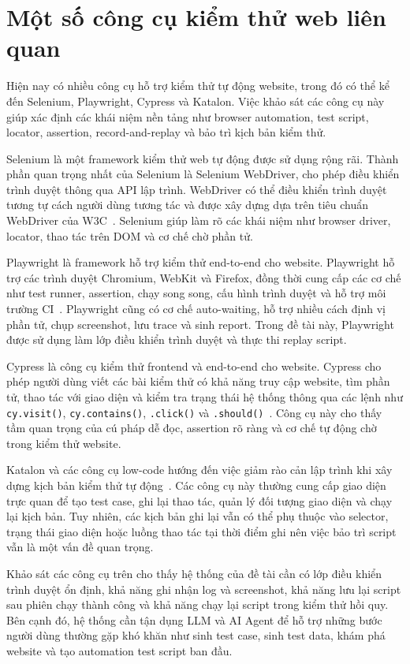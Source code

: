\section{Một số công cụ kiểm thử web liên quan}

Hiện nay có nhiều công cụ hỗ trợ kiểm thử tự động website, trong đó có thể kể đến Selenium, Playwright, Cypress và Katalon. Việc khảo sát các công cụ này giúp xác định các khái niệm nền tảng như browser automation, test script, locator, assertion, record-and-replay và bảo trì kịch bản kiểm thử.

Selenium là một framework kiểm thử web tự động được sử dụng rộng rãi. Thành phần quan trọng nhất của Selenium là Selenium WebDriver, cho phép điều khiển trình duyệt thông qua API lập trình. WebDriver có thể điều khiển trình duyệt tương tự cách người dùng tương tác và được xây dựng dựa trên tiêu chuẩn WebDriver của W3C~\cite{selenium_webdriver}. Selenium giúp làm rõ các khái niệm như browser driver, locator, thao tác trên DOM và cơ chế chờ phần tử.

Playwright là framework hỗ trợ kiểm thử end-to-end cho website. Playwright hỗ trợ các trình duyệt Chromium, WebKit và Firefox, đồng thời cung cấp các cơ chế như test runner, assertion, chạy song song, cấu hình trình duyệt và hỗ trợ môi trường CI~\cite{playwright_docs}. Playwright cũng có cơ chế auto-waiting, hỗ trợ nhiều cách định vị phần tử, chụp screenshot, lưu trace và sinh report. Trong đề tài này, Playwright được sử dụng làm lớp điều khiển trình duyệt và thực thi replay script.

Cypress là công cụ kiểm thử frontend và end-to-end cho website. Cypress cho phép người dùng viết các bài kiểm thử có khả năng truy cập website, tìm phần tử, thao tác với giao diện và kiểm tra trạng thái hệ thống thông qua các lệnh như \texttt{cy.visit()}, \texttt{cy.contains()}, \texttt{.click()} và \texttt{.should()}~\cite{cypress_docs}. Công cụ này cho thấy tầm quan trọng của cú pháp dễ đọc, assertion rõ ràng và cơ chế tự động chờ trong kiểm thử website.

Katalon và các công cụ low-code hướng đến việc giảm rào cản lập trình khi xây dựng kịch bản kiểm thử tự động~\cite{katalon_docs}. Các công cụ này thường cung cấp giao diện trực quan để tạo test case, ghi lại thao tác, quản lý đối tượng giao diện và chạy lại kịch bản. Tuy nhiên, các kịch bản ghi lại vẫn có thể phụ thuộc vào selector, trạng thái giao diện hoặc luồng thao tác tại thời điểm ghi nên việc bảo trì script vẫn là một vấn đề quan trọng.

Khảo sát các công cụ trên cho thấy hệ thống của đề tài cần có lớp điều khiển trình duyệt ổn định, khả năng ghi nhận log và screenshot, khả năng lưu lại script sau phiên chạy thành công và khả năng chạy lại script trong kiểm thử hồi quy. Bên cạnh đó, hệ thống cần tận dụng LLM và AI Agent để hỗ trợ những bước người dùng thường gặp khó khăn như sinh test case, sinh test data, khám phá website và tạo automation test script ban đầu.

